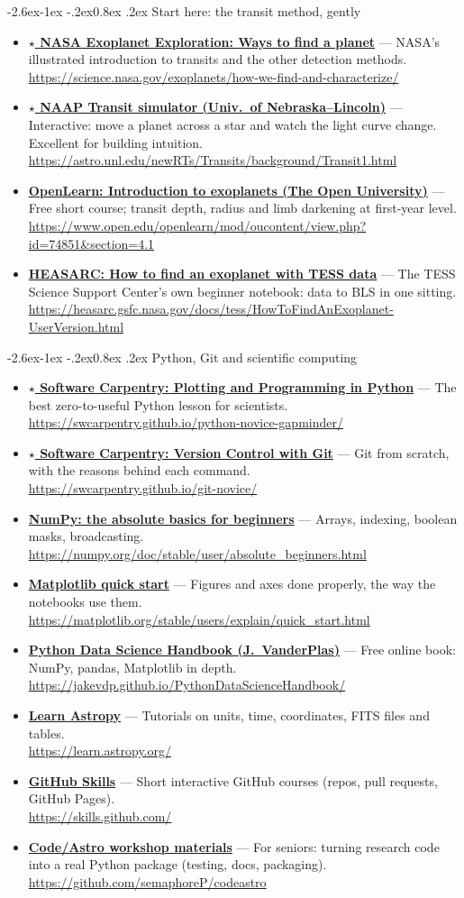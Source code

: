 \documentclass[11pt,a4paper]{article}
\makeatletter
\renewcommand\subsection{\@startsection{subsection}{2}{\z@}%
  {-2.6ex\@plus -1ex \@minus -.2ex}{0.8ex \@plus .2ex}%
  {\normalfont\sffamily\Large\bfseries\color{navy}}}
\newcommand{\res}[3]{\item \textbf{\href{#2}{#1}} --- #3\\[-1pt]{\scriptsize\color{gray}\url{#2}}}
\newenvironment{reslist}{\begin{itemize}\setlength{\itemsep}{5pt}}{\end{itemize}}
\makeatother
\begin{document}
\subsection{Start here: the transit method, gently}
\begin{reslist}
\res{\(\star\) NASA Exoplanet Exploration: Ways to find a planet}{https://science.nasa.gov/exoplanets/how-we-find-and-characterize/}{NASA's illustrated introduction to transits and the other detection methods.}
\res{\(\star\) NAAP Transit simulator (Univ.\ of Nebraska--Lincoln)}{https://astro.unl.edu/newRTs/Transits/background/Transit1.html}{Interactive: move a planet across a star and watch the light curve change. Excellent for building intuition.}
\res{OpenLearn: Introduction to exoplanets (The Open University)}{https://www.open.edu/openlearn/mod/oucontent/view.php?id=74851&section=4.1}{Free short course; transit depth, radius and limb darkening at first-year level.}
\res{HEASARC: How to find an exoplanet with TESS data}{https://heasarc.gsfc.nasa.gov/docs/tess/HowToFindAnExoplanet-UserVersion.html}{The TESS Science Support Center's own beginner notebook: data to BLS in one sitting.}
\end{reslist}

\subsection{Python, Git and scientific computing}
\begin{reslist}
\res{\(\star\) Software Carpentry: Plotting and Programming in Python}{https://swcarpentry.github.io/python-novice-gapminder/}{The best zero-to-useful Python lesson for scientists.}
\res{\(\star\) Software Carpentry: Version Control with Git}{https://swcarpentry.github.io/git-novice/}{Git from scratch, with the reasons behind each command.}
\res{NumPy: the absolute basics for beginners}{https://numpy.org/doc/stable/user/absolute_beginners.html}{Arrays, indexing, boolean masks, broadcasting.}
\res{Matplotlib quick start}{https://matplotlib.org/stable/users/explain/quick_start.html}{Figures and axes done properly, the way the notebooks use them.}
\res{Python Data Science Handbook (J.~VanderPlas)}{https://jakevdp.github.io/PythonDataScienceHandbook/}{Free online book: NumPy, pandas, Matplotlib in depth.}
\res{Learn Astropy}{https://learn.astropy.org/}{Tutorials on units, time, coordinates, FITS files and tables.}
\res{GitHub Skills}{https://skills.github.com/}{Short interactive GitHub courses (repos, pull requests, GitHub Pages).}
\res{Code/Astro workshop materials}{https://github.com/semaphoreP/codeastro}{For seniors: turning research code into a real Python package (testing, docs, packaging).}
\end{reslist}
\end{document}
